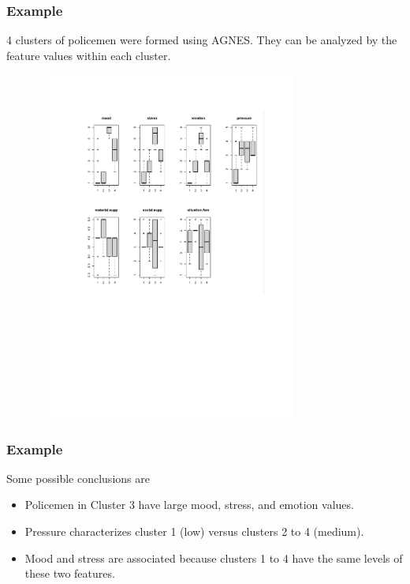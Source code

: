 \begin{frame}
\frametitle{Example}
4 clusters of policemen were formed using AGNES. They can be analyzed by the feature values within each cluster. 
 \vspace{-1cm}
 \begin{figure}[!h]
 \centerline{\includegraphics[width=9cm, height=11.5cm]{../../Graphs/Polstress-groups-4.pdf}}
  \end{figure}
\end{frame}
\begin{frame}
\frametitle{Example}
Some possible conclusions are
\begin{itemize}
\item Policemen in Cluster 3 have large mood, stress, and emotion values. 
\item Pressure characterizes cluster 1 (low) versus clusters 2 to 4 (medium).
\item Mood and stress are associated because clusters 1 to 4 have the same levels of these two features.
\end{itemize}
\end{frame}


